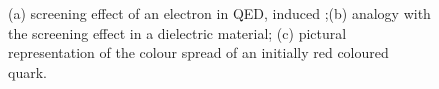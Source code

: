 \begin{figure}[t]
\begin{center}
\end{center}
\caption{(a) screening effect of an electron in QED, induced ;(b) analogy with the screening effect in a dielectric material; (c) pictural representation of the colour spread of an initially red coloured quark. }
\label{fig:ProbingTestCHarge}
\end{figure}

